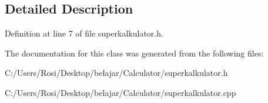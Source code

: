 \subsection{Detailed Description}




Definition at line 7 of file superkalkulator.h.

The documentation for this class was generated from the following files:\begin{CompactItemize}
\item 
C:/Users/Rosi/Desktop/belajar/Calculator/superkalkulator.h\item 
C:/Users/Rosi/Desktop/belajar/Calculator/superkalkulator.cpp\end{CompactItemize}
